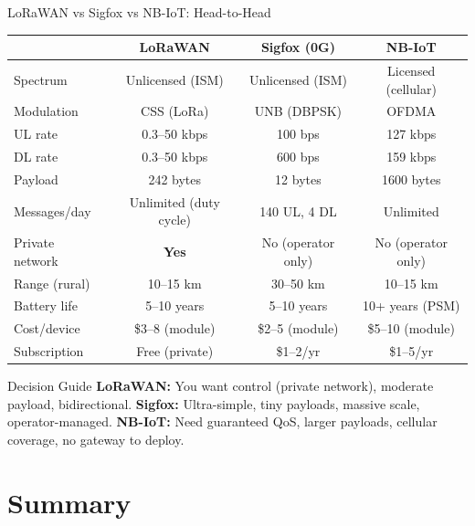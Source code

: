 \documentclass[aspectratio=169,11pt]{beamer}
\begin{document}
\begin{frame}{LoRaWAN vs Sigfox vs NB-IoT: Head-to-Head}
    \begin{center}
    \begin{tabular}{lccc}
        \toprule
        & \textbf{LoRaWAN} & \textbf{Sigfox (0G)} & \textbf{NB-IoT} \\
        \midrule
        Spectrum & Unlicensed (ISM) & Unlicensed (ISM) & Licensed (cellular) \\
        Modulation & CSS (LoRa) & UNB (DBPSK) & OFDMA \\
        UL rate & 0.3--50 kbps & 100 bps & 127 kbps \\
        DL rate & 0.3--50 kbps & 600 bps & 159 kbps \\
        Payload & 242 bytes & 12 bytes & 1600 bytes \\
        Messages/day & Unlimited (duty cycle) & 140 UL, 4 DL & Unlimited \\
        Private network & \textbf{Yes} & No (operator only) & No (operator only) \\
        Range (rural) & 10--15 km & 30--50 km & 10--15 km \\
        Battery life & 5--10 years & 5--10 years & 10+ years (PSM) \\
        Cost/device & \$3--8 (module) & \$2--5 (module) & \$5--10 (module) \\
        Subscription & Free (private) & \$1--2/yr & \$1--5/yr \\
        \bottomrule
    \end{tabular}
    \end{center}
    
    \vspace{0.2cm}
    \begin{alertblock}{Decision Guide}
        \textbf{LoRaWAN:} You want control (private network), moderate payload, bidirectional.
        \textbf{Sigfox:} Ultra-simple, tiny payloads, massive scale, operator-managed.
        \textbf{NB-IoT:} Need guaranteed QoS, larger payloads, cellular coverage, no gateway to deploy.
    \end{alertblock}
\end{frame}

\section{Summary}
\end{document}
